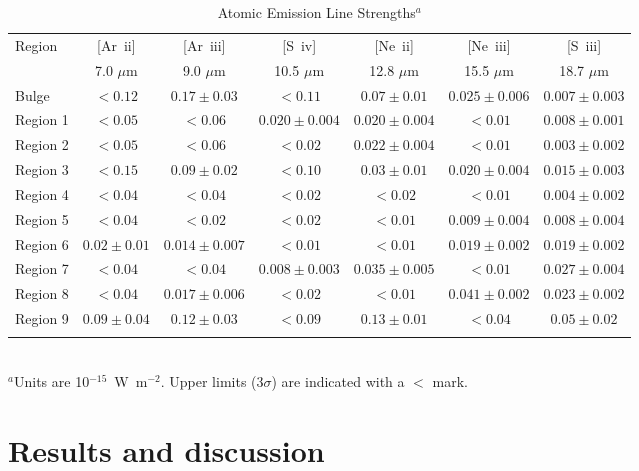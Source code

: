 \documentclass[useAMS,usenatbib,a4paper]{mn2e}
\begin{document}
\begin{table}
 \centering
 \begin{minipage}{100mm}
\caption{Atomic Emission Line Strengths$^a$}
  \begin{tabular}{l c c  c  c  c  c  }
  \hline
  {Region  }&{[Ar~{\sc ii}] }&{[Ar~{\sc iii}]  }&{[S~{\sc iv}]}&{[Ne~{\sc ii}]   }&{[Ne~{\sc iii}]   }&{[S~{\sc iii}]  }\\
{}&{\tiny{7.0 $\mu$m} }&{\tiny{9.0 $\mu$m }}&{\tiny{10.5 $\mu$m}}&{\tiny{12.8 $\mu$m  }}&{\tiny{15.5 $\mu$m } }&{\tiny{18.7 $\mu$m }} \\
 \hline 
       Bulge  & $<0.12$ & $0.17 \pm 0.03$ & $<0.11$ & $0.07 \pm 0.01$ & $0.025 \pm 0.006$ & $0.007 \pm 0.003$\\
    Region 1  & $<0.05$ & $<0.06$ & $0.020 \pm 0.004$ & $0.020 \pm 0.004$ & $<0.01$ & $0.008 \pm 0.001$\\
    Region 2  & $<0.05$ & $<0.06$ & $<0.02$ & $0.022 \pm 0.004$ & $<0.01$ & $0.003 \pm 0.002$\\
    Region 3  & $<0.15$ & $0.09 \pm 0.02$ & $<0.10$ & $0.03 \pm 0.01$ & $0.020 \pm 0.004$ & $0.015 \pm 0.003$\\
    Region 4  & $<0.04$ & $<0.04$ & $<0.02$ & $<0.02$ & $<0.01$ & $0.004 \pm 0.002$\\
    Region 5  & $<0.04$ & $<0.02$ & $<0.02$ & $<0.01$ & $0.009 \pm 0.004$ & $0.008 \pm 0.004$\\
    Region 6  & $0.02 \pm 0.01$ & $0.014 \pm 0.007$ & $<0.01$ & $<0.01$ & $0.019 \pm 0.002$ & $0.019 \pm 0.002$\\
    Region 7  & $<0.04$ & $<0.04$ & $0.008 \pm 0.003$ & $0.035 \pm 0.005$ & $<0.01$ & $0.027 \pm 0.004$\\
    Region 8  & $<0.04$ & $0.017 \pm 0.006$ & $<0.02$ & $<0.01$ & $0.041 \pm 0.002$ & $0.023 \pm 0.002$\\
    Region 9  & $0.09 \pm 0.04$ & $0.12 \pm 0.03$ & $<0.09$ & $0.13 \pm 0.01$ & $<0.04$ & $0.05 \pm 0.02$\\
\hline
 \label{Atomic}
\end{tabular}\\
{ $^a$Units are 10$^{-15}$~W~m$^{-2}$. Upper limits ($3\sigma$) are indicated with a $<$ mark.  }
\end{minipage}
\end{table}



\section{Results and discussion}
\end{document}
